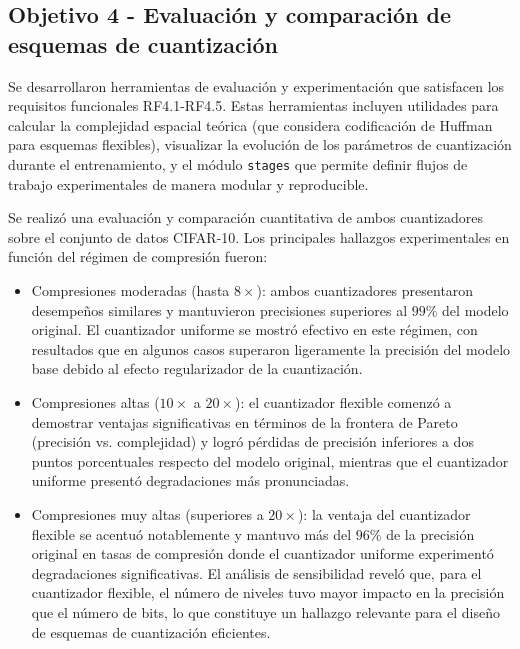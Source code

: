 \subsection{Objetivo 4 - Evaluación y comparación de esquemas de cuantización}

Se desarrollaron herramientas de evaluación y experimentación que satisfacen los requisitos funcionales RF4.1-RF4.5. Estas herramientas incluyen utilidades para calcular la complejidad espacial teórica (que considera codificación de Huffman para esquemas flexibles), visualizar la evolución de los parámetros de cuantización durante el entrenamiento, y el módulo \texttt{stages} que permite definir flujos de trabajo experimentales de manera modular y reproducible.

Se realizó una evaluación y comparación cuantitativa de ambos cuantizadores sobre el conjunto de datos CIFAR-10. Los principales hallazgos experimentales en función del régimen de compresión fueron:

\begin{itemize}
    \item Compresiones moderadas (hasta $8\times$): ambos cuantizadores presentaron desempeños similares y mantuvieron precisiones superiores al $99\%$ del modelo original. El cuantizador uniforme se mostró efectivo en este régimen, con resultados que en algunos casos superaron ligeramente la precisión del modelo base debido al efecto regularizador de la cuantización.

    \item Compresiones altas ($10\times$ a $20\times$): el cuantizador flexible comenzó a demostrar ventajas significativas en términos de la frontera de Pareto \cite{pareto1906manuale} (precisión vs. complejidad) y logró pérdidas de precisión inferiores a dos puntos porcentuales respecto del modelo original, mientras que el cuantizador uniforme presentó degradaciones más pronunciadas.

    \item Compresiones muy altas (superiores a $20\times$): la ventaja del cuantizador flexible se acentuó notablemente y mantuvo más del $96\%$ de la precisión original en tasas de compresión donde el cuantizador uniforme experimentó degradaciones significativas. El análisis de sensibilidad reveló que, para el cuantizador flexible, el número de niveles tuvo mayor impacto en la precisión que el número de bits, lo que constituye un hallazgo relevante para el diseño de esquemas de cuantización eficientes.
\end{itemize}

